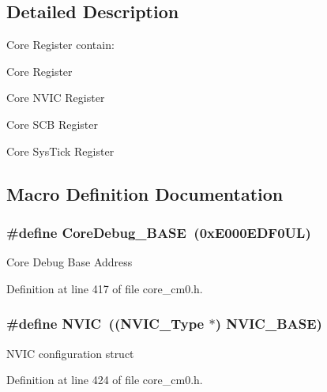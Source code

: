 \subsection{Detailed Description}
Core Register contain\+:
\begin{DoxyItemize}
\item Core Register
\item Core N\+V\+IC Register
\item Core S\+CB Register
\item Core Sys\+Tick Register 
\end{DoxyItemize}

\subsection{Macro Definition Documentation}
\subsubsection[{\texorpdfstring{Core\+Debug\+\_\+\+B\+A\+SE}{CoreDebug_BASE}}]{\setlength{\rightskip}{0pt plus 5cm}\#define Core\+Debug\+\_\+\+B\+A\+SE~(0x\+E000\+E\+D\+F0\+U\+L)}\hypertarget{group___c_m_s_i_s__core__register_ga680604dbcda9e9b31a1639fcffe5230b}{}\label{group___c_m_s_i_s__core__register_ga680604dbcda9e9b31a1639fcffe5230b}
Core Debug Base Address 

Definition at line 417 of file core\+\_\+cm0.\+h.

\subsubsection[{\texorpdfstring{N\+V\+IC}{NVIC}}]{\setlength{\rightskip}{0pt plus 5cm}\#define N\+V\+IC~(({\bf N\+V\+I\+C\+\_\+\+Type} $\ast$)          {\bf N\+V\+I\+C\+\_\+\+B\+A\+SE})}\hypertarget{group___c_m_s_i_s__core__register_gac8e97e8ce56ae9f57da1363a937f8a17}{}\label{group___c_m_s_i_s__core__register_gac8e97e8ce56ae9f57da1363a937f8a17}
N\+V\+IC configuration struct 

Definition at line 424 of file core\+\_\+cm0.\+h.

